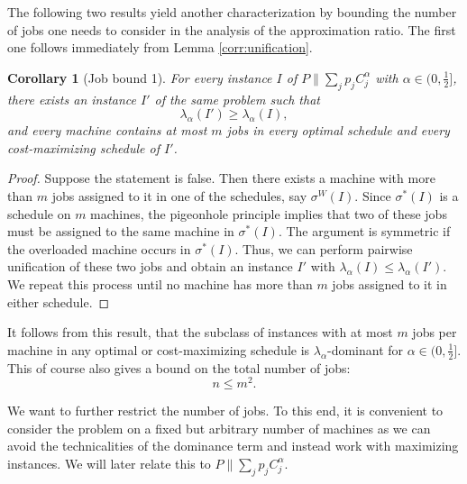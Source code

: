 \documentclass[%
english, titlepage=false %
]{./tum-templates/book/tumbook}
\newtheorem{corollary}{Corollary}
\newcommand{\Problem}{P\!\parallel\!\sum_j p_j C^{\alpha}_j}
\begin{document}
The following two results yield another characterization by bounding the 
number of jobs one needs to consider in the analysis of the approximation ratio. 
The first one follows immediately from Lemma \ref{corr:unification}.

\begin{corollary}[Job bound 1]\label{corr: job bound1}
For every instance $I$ of $\Problem$ with
$\alpha\in\Big(0,\frac12\Big]$, there exists an instance $I'$ of the same
problem such that
\[
    \lambda_\alpha(I')\geq\lambda_\alpha(I),
\]
and every machine contains at most $m$ jobs in every optimal schedule
and every cost-maximizing schedule of $I'$.
\end{corollary}

\begin{proof}
    Suppose the statement is false.
    Then there exists a machine with more than \(m\) jobs assigned to it
    in one of the schedules, say \(\sigma^{W}(I)\). Since \(\sigma^{*}(I)\)
    is a schedule on \(m\) machines, the pigeonhole principle implies that two of
    these jobs must be assigned to the same machine in \(\sigma^{*}(I)\). The
    argument is symmetric if the overloaded machine occurs in \(\sigma^{*}(I)\).    
    Thus, we can perform pairwise unification of these two jobs and obtain an instance $I'$ with $\lambda_{\alpha}(I)\le\lambda_{\alpha}(I')$.
    We repeat this process until no machine has more than \(m\) jobs assigned to it in either schedule.
\end{proof}

It follows from this result, that the subclass of instances with at most \(m\) jobs per machine in any 
optimal or cost-maximizing schedule is \(\lambda_{\alpha}\)-dominant for \(\alpha \in \Big(0, \frac{1}{2}\Big]\).
This of course also gives  a bound on the total number of jobs:
\[
n \le m^2.
\]

We want to further restrict the number of jobs. To this end, it is convenient to consider the problem on a fixed but arbitrary 
number of machines as we can avoid the technicalities of the dominance term and instead work with maximizing instances.
We will later relate this to $\Problem$.
\end{document}
